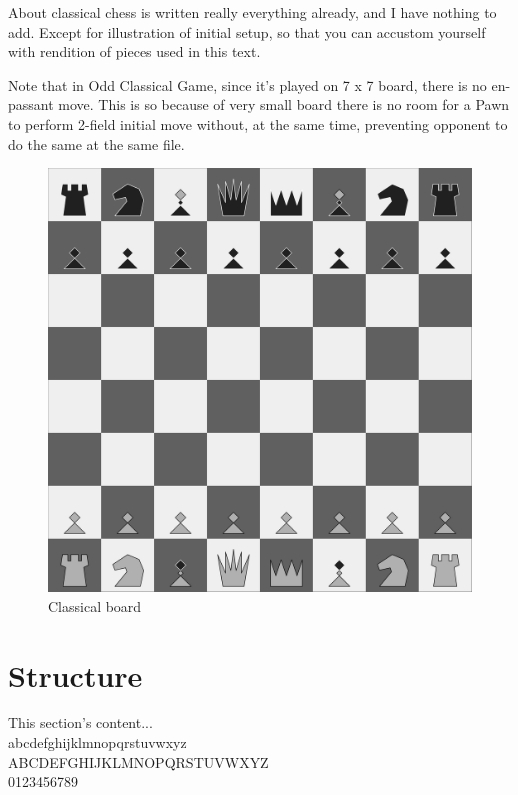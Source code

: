 \documentclass[a5paper,12pt,draft]{book}
\begin{document}
About classical chess is written really everything already, and I
have nothing to add. Except for illustration of initial setup, so that
you can accustom yourself with rendition of pieces used in this text.

Note that in Odd Classical Game, since it's played on 7 x 7
board, there is no en-passant move. This is so because of very
small board there is no room for a Pawn to perform 2-field initial
move without, at the same time, preventing opponent to do the same
at the same file.

\noindent
\begin{figure}[t]
\includegraphics[width=1.0\textwidth, keepaspectratio=true]{../gfx/boards/02_classical.png}
\caption{Classical board}
\end{figure}

\clearpage

\section*{Structure}
\small{This section's content... \\
abcdefghijklmnopqrstuvwxyz \\
ABCDEFGHIJKLMNOPQRSTUVWXYZ \\
0123456789}
\end{document}
